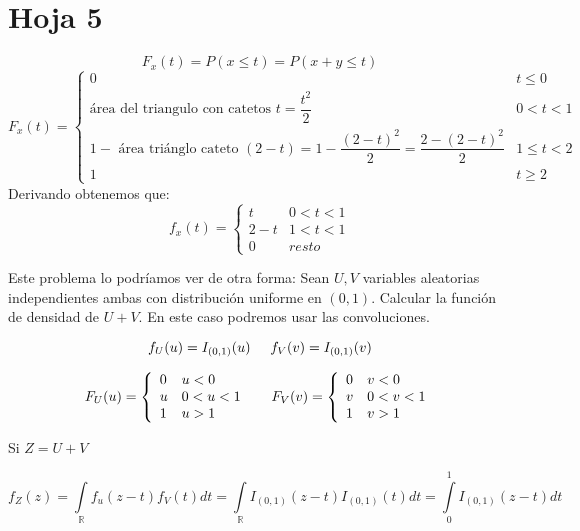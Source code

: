 \documentclass[openany]{book}
\begin{document}
\chapter{Hoja 5}

\setcounter{ex}{1}

\begin{exercise}
    $$ F_{x}(t) = P(x\leq t) = P(x+y\leq t) $$
    $$ F_{x}(t) = \left\{
    \begin{array}{ll}
        0 & t\leq 0\\
         \text{área del triangulo con catetos } t = \dfrac{t^2}{2} & 0 < t < 1\\
         1-\text{ área triánglo cateto } (2-t) = 1-\dfrac{(2-t)^2}{2} = \dfrac{2-(2-t)^2}{2} & 1\leq t < 2\\
         1 & t \geq 2
    \end{array}
    \right. $$
    Derivando obtenemos que:
    $$ f_{x}(t) = \left\{
    \begin{array}{ll}
        t & 0 < t < 1\\
        2-t & 1 < t < 1 \\
        0 & resto
    \end{array}
    \right. $$

    Este problema lo podríamos ver de otra forma: Sean $ U,V $ variables aleatorias independientes ambas con distribución uniforme en $ (0,1) $. Calcular la función de densidad de $ U+V $. En este caso podremos usar las convoluciones.

    $$ f_{U}(u) = I_{(0,1)}(u) \hspace{5mm} f_{V}(v) = I_{(0,1)}(v) $$

    $$ F_{U}(u) = \left\{
        \begin{array}{ll}
            0 & u < 0\\
            u & 0<u<1\\
            1 & u>1
        \end{array}
        \right. \hspace{5mm} F_{V}(v) = \left\{
    \begin{array}{ll}
        0 & v < 0\\
        v & 0<v<1\\
        1 & v>1
    \end{array}
    \right. $$

    Si $ Z = U+V $

$$ f_{Z}(z) = \int\limits_{\mathbb{R}}^{}f_{u}(z-t)f_{V}(t)dt = \int\limits_{\mathbb{R}}^{}I_{(0,1)}(z-t)I_{(0,1)}(t)dt  = \int\limits_{0}^{1}I_{(0,1)}(z-t)dt $$


\end{exercise}
\end{document}
